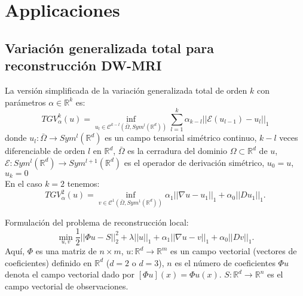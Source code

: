 \documentclass[12pt,draftcls, onecolumn, letterpaper,compsoc]{IEEEtran}
\begin{document}
\section{Applicaciones}
\subsection{Variaci\'{o}n generalizada total para reconstrucci\'{o}n DW-MRI}
La versi\'{o}n simplificada de la variaci\'{o}n generalizada total de orden $k$ con par\'{a}metros $\alpha \in \mathbb{R}^{k}$ es:
\begin{equation}
    TGV_{\alpha}^{k}(u)= \inf_{u_l \in \mathcal{C}^{k-l}(\bar{\Omega}, Sym^{l}(\mathbb{R}^{d}) )} \sum_{l=1}^{k} \alpha_{k-l}||\mathcal{E}(u_{l-1}) - u_{l}||_1
\end{equation}
donde $u_l:\bar{\Omega} \rightarrow Sym^{l}(\mathbb{R}^{d})$ es un campo tensorial sim\'{e}trico continuo, $k-l$ veces diferenciable de orden $l$ en $\mathbb{R}^{d}$, $\bar{\Omega}$ es la cerradura del dominio $\Omega \subset \mathbb{R}^{d}$ de $u$, $\mathcal{E}: Sym^{l}(\mathbb{R}^{d}) \rightarrow Sym^{l+1}(\mathbb{R}^{d})$ es el operador de derivaci\'{o}n sim\'{e}trico, $u_0 = u$, $u_k = 0$\\

En el caso $k=2$ tenemos:
\begin{equation}
    TGV_{\alpha}^{2}(u)= \inf_{v \in \mathcal{C}^{1}(\bar{\Omega}, Sym^{1}(\mathbb{R}^{d}) )} \alpha_{1}||\nabla u - u_{1}||_{1} + \alpha_{0}||D u_{1}||_{1}.
\end{equation}

Formulaci\'{o}n del problema de reconstrucci\'{o}n local:
\begin{equation}
    \min_{u, v} \frac{1}{2}||\Phi u - S||_{2}^{2} + \lambda ||u||_1 + \alpha_{1}||\nabla u - v||_{1} + \alpha_{0}||D v||_{1}.
\end{equation}
Aqu\'{i}, $\Phi$ es una matriz de $n\times m$,  $u:\mathbb{R}^{d} \rightarrow \mathbb{R}^{m}$ es un campo vectorial (vectores de coeficientes) definido en $\mathbb{R}^{d}$ ($d=2$ o $d=3$), $n$ es el n\'{u}mero de coeficientes $\Phi u$ denota el campo vectorial dado por $\left[\Phi u\right] (x) = \Phi u(x)$. $S:\mathbb{R}^{d} \rightarrow \mathbb{R}^{n}$ es el campo vectorial de observaciones.\\
\end{document}
